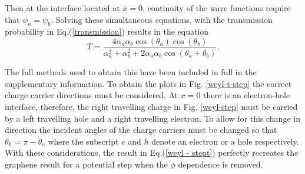 \documentclass[prb,twocolumn,aps,superscriptaddress,showpacs,floatfix]{revtex4}
\begin{document}
	Then at the interface located at $x=0$, continuity of the wave functions require that $\psi_{a}=\psi_{b}$. Solving these simultaneous equations, with the transmission probability in Eq.(\ref{transmission}) results in the equation
\begin{equation}
	T=\frac{4\alpha_{a}\alpha_{b}\cos\left(\theta_{a}\right)\cos\left(\theta_{b}\right)}{\alpha_{a}^{2}+\alpha_{b}^{2}+2\alpha_{a}\alpha_{b}\cos\left(\theta_{a}+\theta_{b}\right)}.
	\label{weyl - stept}
\end{equation}

	The full methods used to obtain this have been included in full in the supplementary information. To obtain the plots in Fig. \ref{weyl-t-step} the correct charge carrier directions must be considered. At $x=0$ there is an electron-hole interface, therefore, the right travelling charge in Fig. \ref{weyl-step} must be carried by a left travelling hole and a right travelling electron. To allow for this change in direction the incident angles of the charge carriers must be changed so that $\theta_{h}=\pi-\theta_{e}$ \cite{b40} where the subscript $e$ and $h$ denote an electron or a hole respectively. With these considerations, the result in Eq.(\ref{weyl - stept}) perfectly recreates the graphene result for a potential step \cite{b13, b52} when the $\phi$ dependence is removed.
\end{document}
